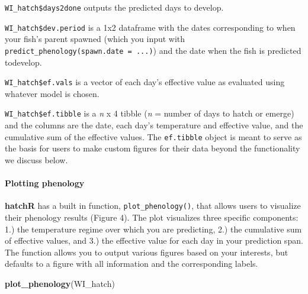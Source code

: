 \documentclass[10pt,a4paper,onecolumn]{article}
\let\oldparagraph\paragraph
\renewcommand{\paragraph}[1]{\oldparagraph{#1}\mbox{}}
\newenvironment{Shaded}{\begin{snugshade}}{\end{snugshade}}
\newcommand{\FunctionTok}[1]{\textcolor[rgb]{0.13,0.29,0.53}{\textbf{#1}}}
\newcommand{\NormalTok}[1]{#1}
\begin{document}
\texttt{WI\_hatch\$days2done} outputs the predicted days to develop.

\texttt{WI\_hatch\$dev.period} is a 1x2 dataframe with the dates
corresponding to when your fish's parent spawned (which you input with
\texttt{predict\_phenology(spawn.date\ =\ ...)}) and the date when the
fish is predicted todevelop.

\texttt{WI\_hatch\$ef.vals} is a vector of each day's effective value as
evaluated using whatever model is chosen.

\texttt{WI\_hatch\$ef.tibble} is a \emph{n} x 4 tibble (\emph{n} =
number of days to hatch or emerge) and the columns are the date, each
day's temperature and effective value, and the cumulative sum of the
effective values. The \texttt{ef.tibble} object is meant to serve as the
basis for users to make custom figures for their data beyond the
functionality we discuss below.

\paragraph{Plotting phenology}\label{plotting-phenology}

\textbf{hatchR} has a built in function, \texttt{plot\_phenology()},
that allows users to visualize their phenology results (Figure 4). The
plot visualizes three specific components: 1.) the temperature regime
over which you are predicting, 2.) the cumulative sum of effective
values, and 3.) the effective value for each day in your prediction
span. The function allows you to output various figures based on your
interests, but defaults to a figure with all information and the
corresponding labels.

\begin{Shaded}
\begin{Highlighting}[]
\FunctionTok{plot\_phenology}\NormalTok{(WI\_hatch)}
\end{Highlighting}
\end{Shaded}
\end{document}
